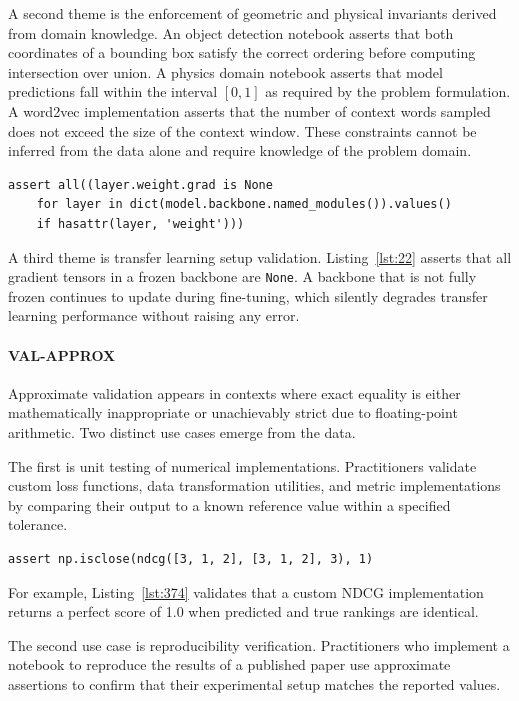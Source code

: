A second theme is the enforcement of geometric and physical invariants
derived from domain knowledge.
An object detection notebook asserts that both coordinates of a bounding box
satisfy the correct ordering before computing intersection over union.
A physics domain notebook asserts that model predictions
fall within the interval \([0, 1]\)
as required by the problem formulation.
A word2vec implementation asserts that the number of context words sampled
does not exceed the size of the context window.
These constraints cannot be inferred from the data alone
and require knowledge of the problem domain.

\begin{lstlisting}[caption={}, label={lst:22}]
assert all((layer.weight.grad is None
    for layer in dict(model.backbone.named_modules()).values()
    if hasattr(layer, 'weight')))
\end{lstlisting}

A third theme is transfer learning setup validation.
Listing~\ref{lst:22} asserts that all gradient tensors in a frozen backbone are \lstinline{None}.
A backbone that is not fully frozen continues to update during fine-tuning,
which silently degrades transfer learning performance without raising any error.

\paragraph{VAL-APPROX}

Approximate validation appears in contexts
where exact equality is either mathematically inappropriate
or unachievably strict due to floating-point arithmetic.
Two distinct use cases emerge from the data.

The first is unit testing of numerical implementations.
Practitioners validate custom loss functions,
data transformation utilities,
and metric implementations
by comparing their output to a known reference value within a specified tolerance.

\begin{lstlisting}[caption={}, label={lst:374}]
assert np.isclose(ndcg([3, 1, 2], [3, 1, 2], 3), 1)
\end{lstlisting}

For example, Listing~\ref{lst:374} validates
that a custom NDCG implementation returns a perfect score of 1.0
when predicted and true rankings are identical.

The second use case is reproducibility verification.
Practitioners who implement a notebook to reproduce the results of a published paper
use approximate assertions to confirm that their experimental setup matches the reported values.

